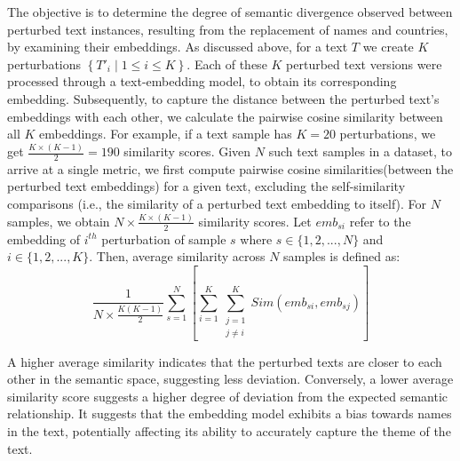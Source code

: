 The objective is to determine the degree of semantic divergence observed between perturbed text instances, resulting from the replacement of names and countries, by examining their embeddings. As discussed above, for a text $T$ we create $K$ perturbations  $\left\{ T'_i \mid 1 \leq i \leq K \right\}$. Each of these $K$ perturbed text versions were processed through a text-embedding model, to obtain its corresponding embedding.
Subsequently, to capture the distance between the perturbed text's embeddings with each other, we calculate the pairwise cosine similarity between all $K$ embeddings.  For example, if a text sample has $K{=}20$ perturbations, we get $\frac{K \times (K-1)}{2}= 190$ similarity scores. Given $N$ such text samples in a dataset, to arrive at a single metric, we first compute pairwise cosine similarities(between the perturbed text embeddings) for a given text, excluding the self-similarity comparisons (i.e., the similarity of a perturbed text embedding to itself). For $N$ samples, we obtain $N \times \frac{K \times (K-1)}{2} $ similarity scores. Let $emb_{si}$ refer to the embedding of $i^{th}$ perturbation of sample $s$ where $s \in \{1, 2, ..., N\}$ and $i \in \{1, 2, ..., K\}$.  Then, average similarity across $N$ samples is defined as: \vspace{-0.09in}
\begin{equation}
\nonumber
    \frac{1}{N \times \frac{K(K-1)}{2}} \sum_{s=1}^{N} \left[ \sum_{i=1}^{K} \sum_{\substack{j=1 \\ j \neq i}}^{K} {Sim}(emb_{si}, emb_{sj}) \right]
\end{equation}
\normalsize
\vspace{-0.1in}


 A higher average similarity indicates that the perturbed texts are closer to each other in the semantic space, suggesting less deviation. Conversely, a lower average similarity score suggests a higher degree of deviation from the expected semantic relationship. It suggests that the embedding model exhibits a bias towards names in the text, potentially affecting its ability to accurately capture the theme of the text.

